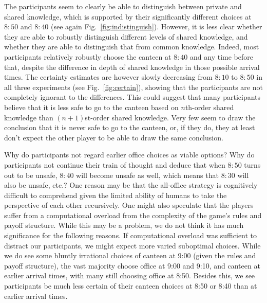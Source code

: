 The participants seem to clearly be able to distinguish between private and shared knowledge, which is supported by their significantly different choices at $8{:}50$ and $8{:}40$ (see again Fig.~\ref{fig:indistinguish}). However, it is less clear whether they are able to robustly distinguish different levels of shared knowledge, and whether they are able to distinguish that from common knowledge. Indeed, most participants relatively robustly choose the canteen at $8{:}40$ and any time before that, despite the difference in depth of shared knowledge in those possible arrival times. The certainty estimates are however slowly decreasing from $8{:}10$ to $8{:}50$ in all three experiments (see Fig.~\ref{fig:certain}), showing that the participants are not completely ignorant to the differences. This could suggest that many participants believe that it is less safe to go to the canteen based on $n$th-order shared knowledge than $(n+1)$st-order shared knowledge. Very few seem to draw the conclusion that it is never safe to go to the canteen, or, if they do, they at least don't expect the other player to be able to draw the same conclusion. 

Why do participants not regard earlier office choices as viable options? Why do participants not continue their train of thought and deduce that when $8{:}50$ turns out to be unsafe, $8{:}40$ will become unsafe as well, which means that $8{:}30$ will also be unsafe, etc.? One reason may be that the all-office strategy is cognitively difficult to comprehend given the  limited  ability of humans to take the perspective of each other recursively. 
One might also speculate that the players suffer from a 
computational overload from the complexity of the game's rules and payoff structure. While this may be a problem, we do not think it has much significance for the following reasons. If computational overload was sufficient to distract our participants, we might expect more varied suboptimal choices. While we do see some bluntly irrational choices of canteen at 9:00 (given the rules and payoff structure), the vast majority choose office at 9:00 and 9:10, and canteen at earlier arrival times, with many still choosing office at 8:50. Besides this, we see participants be much less certain of their canteen choices at 8:50 or 8:40 than at earlier arrival times. 

